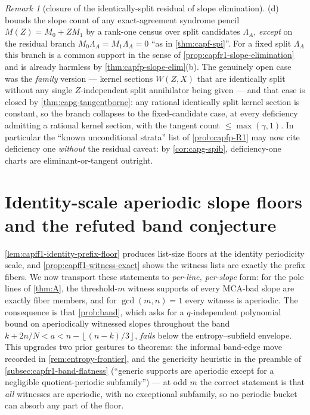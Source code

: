 \documentclass[11pt]{article}
\theoremstyle{definition}
\theoremstyle{remark}
\newtheorem{remark}[remark]{Remark}
\providecommand{\floor}[1]{\left\lfloor #1\right\rfloor}
\begin{document}
\begin{remark}[closure of the identically-split residual of slope
elimination]\label{rem:capg-slopeelim-closure}
\textup{(d)} bounds the slope count of any
exact-agreement syndrome pencil $M(Z)=M_0+ZM_1$ by a rank-one census over
split candidates $\Lambda_A$, \emph{except} on the residual branch
$M_0\Lambda_A=M_1\Lambda_A=0$ ``as in \cref{thm:capf-spi}''.  For a fixed
split $\Lambda_A$ this branch is a common support in the sense of
\cref{prop:capfr1-slope-elimination} and is already harmless by
\cref{thm:capfp-slope-elim}\textup{(b)}.  The genuinely open case was the
\emph{family} version --- kernel sections $W(Z,X)$ that are identically
split without any single $Z$-independent split annihilator being given
--- and that case is closed by \cref{thm:capg-tangentborne}: any rational
identically split kernel section is constant, so the branch collapses to
the fixed-candidate case, at every deficiency admitting a rational kernel
section, with the tangent count $\le\max(\gamma,1)$.  In particular the
``known unconditional strata'' list of \cref{prob:capfp-R1} may now cite
deficiency one \emph{without} the residual caveat: by
\cref{cor:capg-spib}, deficiency-one charts are eliminant-or-tangent
outright.
\end{remark}

\section{Identity-scale aperiodic slope floors and the refuted band
conjecture}\label{sec:capg-floors}

\cref{lem:capff1-identity-prefix-floor} produces list-size floors at the
identity periodicity scale, and \cref{prop:capff1-witness-exact} shows the
witness lists are exactly the prefix fibers.  We now transport these
statements to \emph{per-line, per-slope} form: for the pole lines of
\cref{thm:A}, the threshold-$m$ witness supports of every MCA-bad slope
are exactly fiber members, and for $\gcd(m,n)=1$ every witness is
aperiodic.  The consequence is that \cref{prob:band}, which asks for a
$q$-independent polynomial bound on aperiodically witnessed slopes
throughout the band $k+2n/N<a<n-\floor{(n-k)/3}$, \emph{fails} below the
entropy--subfield envelope.  This upgrades two prior gestures to
theorems: the informal band-edge move recorded in
\cref{rem:entropy-frontier}, and the genericity heuristic in the preamble
of \cref{subsec:capfr1-band-flatness} (``generic supports are aperiodic
except for a negligible quotient-periodic subfamily'') --- at odd $m$ the
correct statement is that \emph{all} witnesses are aperiodic, with no
exceptional subfamily, so no periodic bucket can absorb any part of the
floor.
\end{document}
